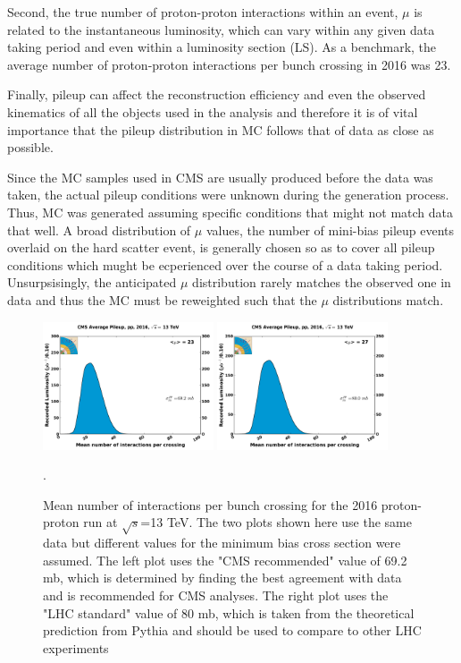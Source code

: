 Second, the true number of proton-proton interactions within an event, $\mu$ is related to the instantaneous luminosity, which can vary within any given data taking period and even within a luminosity section (LS). As a benchmark, the average number of proton-proton interactions per bunch crossing in 2016 was 23.

Finally, pileup can affect the reconstruction efficiency and even the observed kinematics of all the objects used in the analysis and therefore it is of vital importance that the pileup distribution in MC follows that of data as close as possible. 

Since the MC samples used in CMS are usually produced before the data was taken, the actual pileup conditions were unknown during the generation process. Thus, MC was generated assuming specific conditions that might not match data that well. A broad distribution of $\mu$ values, the number of mini-bias pileup events overlaid on the hard scatter event, is generally chosen so as to cover all pileup conditions which mught be ecperienced over the course of a data taking period. Unsurpsisingly, the anticipated $\mu$ distribution rarely matches the observed one in data and thus the MC must be reweighted such that the $\mu$ distributions match.



\begin{figure}
	\centering
	\includegraphics[width=0.45\textwidth]{figures/pileup_pp_2016_69200.png}
	\includegraphics[width=0.45\textwidth]{figures/pileup_pp_2016_80000.png}
	\singlespace
	\caption{Mean number of interactions per bunch crossing for the 2016 proton-proton run at $\sqrt{s}$=13 TeV. The two plots shown here use the same data but different values for the minimum bias cross section were assumed. The left plot uses the "CMS recommended" value of 69.2 mb, which is determined by finding the best agreement with data and is recommended for CMS analyses. The right plot uses the "LHC standard" value of 80 mb, which is taken from the theoretical prediction from Pythia and should be used to compare to other LHC experiments\cite{cmslumitwiki}}.
	\label{fig:cmspu}
	
\end{figure}

